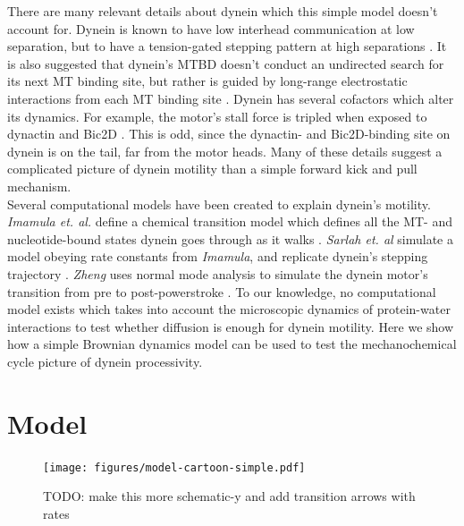 \documentclass[9pt,twocolumn,twoside]{pnas-new}
\begin{document}
There are many relevant details about dynein which this simple model doesn't account for. Dynein is known to have low interhead communication at low separation, but to have a tension-gated stepping pattern at high separations \cite{yildizpaper}. It is also suggested that dynein's MTBD doesn't conduct an undirected search for its next MT binding site, but rather is guided by long-range electrostatic interactions from each MT binding site \cite{longrangemt}. Dynein has several cofactors which alter its dynamics. For example, the motor's stall force is tripled when exposed to dynactin and Bic2D \cite{yildizdynactin}. This is odd, since the dynactin- and Bic2D-binding site on dynein is on the tail, far from the motor heads. Many of these details suggest a complicated picture of dynein motility than a simple forward kick and pull mechanism.\\

Several computational models have been created to explain dynein's motility. \textit{Imamula et. al.} define a chemical transition model which defines all the MT- and nucleotide-bound states dynein goes through as it walks \cite{imamulamodel}. \textit{Sarlah et. al} simulate a model obeying rate constants from \textit{Imamula}, and replicate dynein's stepping trajectory \cite{sarlahmodel}. \textit{Zheng} uses normal mode analysis to simulate the dynein motor's transition from pre to post-powerstroke \cite{normalmodes}. To our knowledge, no computational model exists which takes into account the microscopic dynamics of protein-water interactions to test whether diffusion is enough for dynein motility. Here we show how a simple Brownian dynamics model can be used to test the mechanochemical cycle picture of dynein processivity.\\

\section*{Model}

\begin{figure}[tbhp]
\centering
\texttt{[image: figures/model-cartoon-simple.pdf]}
\caption{TODO: make this more schematic-y and add transition arrows with rates}
\label{fig:model}
\end{figure}
\end{document}
